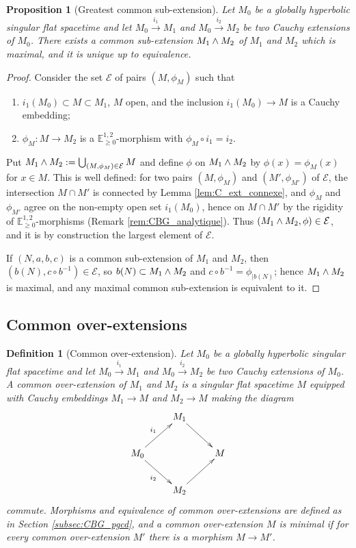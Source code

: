 \documentclass[a4paper,twoside]{article}
\newcommand{\mass}[1]{\mathbb{E}^{1,2}_{#1}}
\newtheorem{prop}[lem]{Proposition}
\newtheorem{defi}[lem]{Definition}
\begin{document}
\begin{prop}[Greatest common sub-extension]\label{prop:Cauchy_pgcd}
Let $M_0$ be a globally hyperbolic singular flat spacetime and let $M_0\xrightarrow{i_1} M_1$ and
$M_0\xrightarrow{i_2} M_2$ be two Cauchy extensions of $M_0$. There exists a common sub-extension
$M_1 \wedge M_2$ of $M_1$ and $M_2$ which is maximal, and it is unique up to equivalence.
\end{prop}
\begin{proof}
Consider the set $\mathcal E$ of pairs $(M,\phi_M)$ such that
\begin{enumerate}[label=(\alph*)]
\item $i_1(M_0)\subset M\subset M_1$, $M$ open, and the inclusion $i_1(M_0)\rightarrow M$ is a Cauchy embedding;
\item $\phi_M:M\rightarrow M_2$ is a $\mass{\geq0}$-morphism with $\phi_M\circ i_1=i_2$.
\end{enumerate}
Put $M_1 \wedge M_2:=\bigcup_{(M,\phi_M)\in \mathcal E} M$ and define $\phi$ on $M_1 \wedge M_2$ by $\phi(x)=\phi_M(x)$
for $x\in M$. This is well defined: for two pairs $(M,\phi_M)$ and $(M',\phi_{M'})$ of $\mathcal E$,
the intersection $M\cap M'$ is connected by Lemma \ref{lem:C_ext_connexe}, and $\phi_M$ and
$\phi_{M'}$ agree on the non-empty open set $i_1(M_0)$, hence on $M\cap M'$ by the rigidity of
$\mass{\geq0}$-morphisms (Remark \ref{rem:CBG_analytique}). Thus $(M_1 \wedge M_2,\phi)\in \mathcal E$, and it
is by construction the largest element of $\mathcal E$.

If $(N,a,b,c)$ is a common sub-extension of $M_1$ and $M_2$, then $\left(b(N),c\circ
b^{-1}\right)\in \mathcal E$, so $b(N)\subset M_1 \wedge M_2$ and $c\circ b^{-1}=\phi_{|b(N)}$; hence $M_1 \wedge M_2$
is maximal, and any maximal common sub-extension is equivalent to it.
\end{proof}

\subsection{Common over-extensions}\label{subsec:CBG_ppcm}

\begin{defi}[Common over-extension]\label{def:common_over_extension}
Let $M_0$ be a globally hyperbolic singular flat spacetime and let $M_0\xrightarrow{i_1} M_1$ and
$M_0\xrightarrow{i_2} M_2$ be two Cauchy extensions of $M_0$. A \emph{common over-extension} of
$M_1$ and $M_2$ is a singular flat spacetime $M$ equipped with Cauchy embeddings $M_1\rightarrow M$
and $M_2\rightarrow M$ making the diagram
$$
	\xymatrix{
		& M_1\ar[dr]&\\
		M_0\ar[ur]^{i_1} \ar[dr]_{i_2}&&M \\
		& M_2\ar[ur]&
	}
$$
commute. Morphisms and equivalence of common over-extensions are defined as in Section
\ref{subsec:CBG_pgcd}, and a common over-extension $M$ is \emph{minimal} if for every common
over-extension $M'$ there is a morphism $M\rightarrow M'$.
\end{defi}
\end{document}
